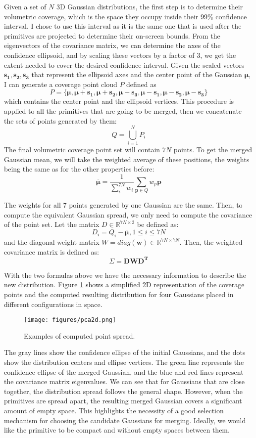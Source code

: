 Given a set of $N$ 3D Gaussian distributions, the first step is to determine their volumetric coverage, which is the space they occupy inside their 99\% confidence interval. I chose to use this interval as it is the same one that is used after the primitives are projected to determine their on-screen bounds. From the eigenvectors of the covariance matrix, we can determine the axes of the confidence ellipsoid, and by scaling these vectors by a factor of 3, we get the extent needed to cover the desired confidence interval. Given the scaled vectors $\bm{s_1}, \bm{s_2}, \bm{s_3}$ that represent the ellipsoid axes and the center point of the Gaussian $\bm{\mu}$, I can generate a coverage point cloud $P$ defined as 
\[P = \{\bm{\mu}, \bm{\mu} + \bm{s_1}, \bm{\mu} + \bm{s_2}, \bm{\mu} + \bm{s_3}, \bm{\mu} - \bm{s_1},\bm{ \mu} - \bm{s_2}, \bm{\mu} - \bm{s_3}\}\]
which contains the center point and the ellipsoid vertices. This procedure is applied to all the primitives that are going to be merged, then we concatenate the sets of points generated by them:
\[Q = \bigcup_{i=1}^N P_i\]
The final volumetric coverage point set will contain $7N$ points. To get the merged Gaussian mean, we will take the weighted average of these positions, the weights being the same as for the other properties before:
\[
\bm{\overline{\mu}} = \frac{1}{\sum_i^{7N} w_i} \sum_{\bm{p} \in Q} w_p\bm{p} 
\]

The weights for all 7 points generated by one Gaussian are the same. Then, to compute the equivalent Gaussian spread, we only need to compute the covariance of the point set. Let the matrix $D \in \mathbb{R}^{7N \times 3}$ be defined as:
\[
D_i = Q_i - \bm{\overline{\mu}}, 1 \leq i \leq 7N
\]
and the diagonal weight matrix $W = diag(\bm{w}) \in \mathbb{R}^{7N \times 7N}$. Then, the weighted covariance matrix \cite{weighted_mean} is defined as:
\[
\Sigma = \bm{DWD^T}
\]

With the two formulas above we have the necessary information to describe the new distribution. Figure \ref{fig:pca2d} shows a simplified 2D representation of the coverage points and the computed resulting distribution for four Gaussians placed in different configurations in space.

\begin{figure}[H]
    \centering
    \texttt{[image: figures/pca2d.png]}
    \caption{Examples of computed point spread.}
    \label{fig:pca2d}
\end{figure}

The gray lines show the confidence ellipse of the initial Gaussians, and the dots show the distribution centers and ellipse vertices. The green line represents the confidence ellipse of the merged Gaussian, and the blue and red lines represent the covariance matrix eigenvalues. We can see that for Gaussians that are close together, the distribution spread follows the general shape. However, when the primitives are spread apart, the resulting merged Gaussian covers a significant amount of empty space. This highlights the necessity of a good selection mechanism for choosing the candidate Gaussians for merging. Ideally, we would like the primitive to be compact and without empty spaces between them.